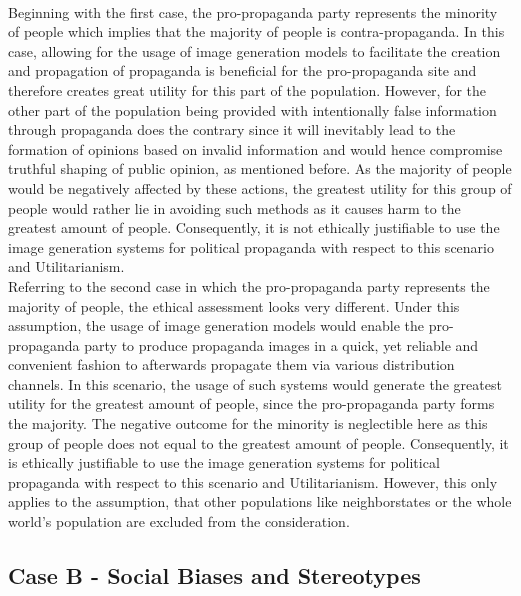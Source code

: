\documentclass[10pt,twocolumn,twoside]{osajnl}
\begin{document}
\\
Beginning with the first case, the pro-propaganda party represents the minority of people which implies that the majority of people is contra-propaganda. In this case,
allowing for the usage of image generation models to facilitate the creation and propagation of propaganda is beneficial for the pro-propaganda site and therefore creates great utility for this part of the population.
However, for the other part of the population being provided with intentionally false information through propaganda does the contrary since it will inevitably lead to the formation of opinions based on 
invalid information and would hence compromise truthful shaping of public opinion, as mentioned before. 
As the majority of people would be negatively affected by these actions, the greatest utility for this group of people would rather lie in avoiding such methods as it causes harm to the greatest amount of people. 
Consequently, it is not ethically justifiable to use the image generation systems for political propaganda with respect to this scenario and Utilitarianism.
\\
Referring to the second case in which the pro-propaganda party represents the majority of people, the ethical assessment looks very different.
Under this assumption, the usage of image generation models would enable the pro-propaganda party to produce propaganda images in a quick, yet reliable and convenient fashion to afterwards 
propagate them via various distribution channels. In this scenario, the usage of such systems would generate the greatest utility for the greatest amount of people, since the pro-propaganda party 
forms the majority. The negative outcome for the minority is neglectible here as this group of people does not equal to the greatest amount of people. Consequently, it is ethically justifiable to use the 
image generation systems for political propaganda with respect to this scenario and Utilitarianism. 
However, this only applies to the assumption, that other populations like neighborstates or the whole world's population are excluded from the consideration. 

\subsection{Case B - Social Biases and Stereotypes}
\end{document}
